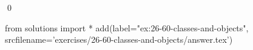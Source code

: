 
\begin{ex}
  \label{ex:26-60-classes-and-objects}
  
  \qed
\end{ex}
\begin{python0}
from solutions import *
add(label="ex:26-60-classes-and-objects",
    srcfilename='exercises/26-60-classes-and-objects/answer.tex')
\end{python0}
